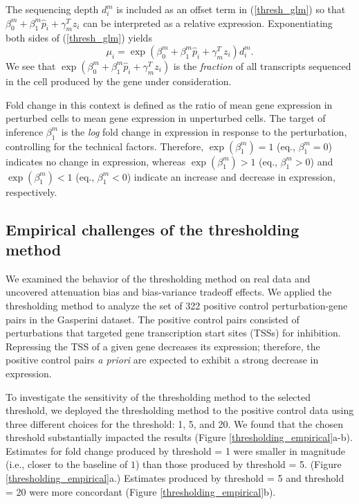 \documentclass[11pt]{article}
\begin{document}
The sequencing depth $d^m_i$ is included as an offset term in (\ref{thresh_glm}) so that $\beta^m_0 + \beta^m_1 \hat{p}_i + \gamma^T_m z_i$ can be interpreted as a relative expression. Exponentiating both sides of (\ref{thresh_glm}) yields
$$\mu_i = \exp \left( \beta^m_0 + \beta^m_1 \hat{p}_i + \gamma^T_m z_i \right) d_i^m.$$ We see that $\exp \left( \beta^m_0 + \beta^m_1 \hat{p}_i + \gamma^T_m z_i \right)$ is the \textit{fraction} of all transcripts sequenced in the cell produced by the gene under consideration.

Fold change in this context is defined as the ratio of mean gene expression in perturbed cells to mean gene expression in unperturbed cells. The target of inference $\beta^m_1$ is the \textit{log} fold change in expression in response to the perturbation, controlling for the technical factors. Therefore, $\exp(\beta^m_1) = 1$ (eq., $\beta^m_1 = 0$) indicates no change in expression, whereas $\exp(\beta^m_1) > 1$ (eq., $\beta^m_1 > 0$) and $\exp(\beta^m_1) < 1$ (eq., $\beta^m_1 < 0$) indicate an increase and decrease in expression, respectively.

\subsection{Empirical challenges of the thresholding method}\label{sec:thresholding_empirical}

We examined the behavior of the thresholding method on real data and uncovered attenuation bias and bias-variance tradeoff effects. We applied the thresholding method to analyze the set of 322 positive control perturbation-gene pairs in the Gasperini dataset. The positive control pairs consisted of perturbations that targeted gene transcription start sites (TSSs) for inhibition. Repressing the TSS of a given gene decreases its expression; therefore, the positive control pairs \textit{a priori} are expected to exhibit a strong decrease in expression.

To investigate the sensitivity of the thresholding method to the selected threshold, we deployed the thresholding method to the positive control data using three different choices for the threshold: 1, 5, and 20. We found that the chosen threshold substantially impacted the results (Figure \ref{thresholding_empirical}a-b). Estimates for fold change produced by threshold = 1 were smaller in magnitude (i.e., closer to the baseline of $1$) than those produced by threshold = 5. (Figure \ref{thresholding_empirical}a.) Estimates produced by threshold = 5 and threshold = 20 were more concordant (Figure \ref{thresholding_empirical}b). 
\end{document}
